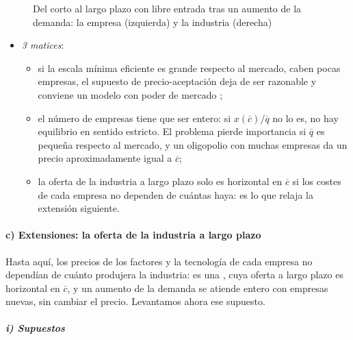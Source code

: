 \documentclass[11pt]{article}
\begin{document}
\begin{figure}[H]
\centering
\caption{Del corto al largo plazo con libre entrada tras un aumento de la demanda: la empresa (izquierda) y la industria (derecha)}\label{fig:corto-largo-industria}
\end{figure}

\begin{itemize}
\item \emph{3 matices}\nocite{MasColellWhinstonGreen1995}:
  \begin{itemize}
  \item si la escala mínima eficiente es grande respecto al mercado, caben pocas empresas, el supuesto de precio-aceptación deja de ser razonable y conviene un modelo con poder de mercado ;
  \item el número de empresas tiene que ser entero: si $x(\overline{c})/\overline{q}$ no lo es, no hay equilibrio en sentido estricto. El problema pierde importancia si $\overline{q}$ es pequeña respecto al mercado, y un oligopolio con muchas empresas da un precio aproximadamente igual a $\overline{c}$;
  \item la oferta de la industria a largo plazo solo es horizontal en $\overline{c}$ si los costes de cada empresa no dependen de cuántas haya: es lo que relaja la extensión siguiente.
  \end{itemize}
\end{itemize}

\paragraph{c) Extensiones: la oferta de la industria a largo plazo}

Hasta aquí, los precios de los factores y la tecnología de cada empresa no dependían de cuánto produjera la industria: es una , cuya oferta a largo plazo es horizontal en $\overline{c}$, y un aumento de la demanda se atiende entero con empresas nuevas, sin cambiar el precio. Levantamos ahora ese supuesto.

\subparagraph{i) Supuestos}
\end{document}
